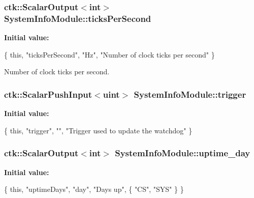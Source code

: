 \subsubsection[{\texorpdfstring{ticks\+Per\+Second}{ticksPerSecond}}]{\setlength{\rightskip}{0pt plus 5cm}ctk\+::\+Scalar\+Output$<$int$>$ System\+Info\+Module\+::ticks\+Per\+Second}\hypertarget{classSystemInfoModule_abd71a50e108b76a81fb644ad745582c5}{}\label{classSystemInfoModule_abd71a50e108b76a81fb644ad745582c5}
{\bfseries Initial value\+:}
\begin{DoxyCode}
\{ \textcolor{keyword}{this}, \textcolor{stringliteral}{"ticksPerSecond"}, \textcolor{stringliteral}{"Hz"},
      \textcolor{stringliteral}{"Number of clock ticks per second"} \}
\end{DoxyCode}


Number of clock ticks per second. 

\subsubsection[{\texorpdfstring{trigger}{trigger}}]{\setlength{\rightskip}{0pt plus 5cm}ctk\+::\+Scalar\+Push\+Input$<$uint$>$ System\+Info\+Module\+::trigger}\hypertarget{classSystemInfoModule_a4b72db835fc0db42887669f6ffbada94}{}\label{classSystemInfoModule_a4b72db835fc0db42887669f6ffbada94}
{\bfseries Initial value\+:}
\begin{DoxyCode}
\{ \textcolor{keyword}{this}, \textcolor{stringliteral}{"trigger"}, \textcolor{stringliteral}{""},
      \textcolor{stringliteral}{"Trigger used to update the watchdog"} \}
\end{DoxyCode}
\subsubsection[{\texorpdfstring{uptime\+\_\+day}{uptime_day}}]{\setlength{\rightskip}{0pt plus 5cm}ctk\+::\+Scalar\+Output$<$int$>$ System\+Info\+Module\+::uptime\+\_\+day}\hypertarget{classSystemInfoModule_ab3f0b6c63b7836c5775713c551a51ec3}{}\label{classSystemInfoModule_ab3f0b6c63b7836c5775713c551a51ec3}
{\bfseries Initial value\+:}
\begin{DoxyCode}
\{ \textcolor{keyword}{this}, \textcolor{stringliteral}{"uptimeDays"}, \textcolor{stringliteral}{"day"}, \textcolor{stringliteral}{"Days up"},
    \{ \textcolor{stringliteral}{"CS"}, \textcolor{stringliteral}{"SYS"} \} \}
\end{DoxyCode}
